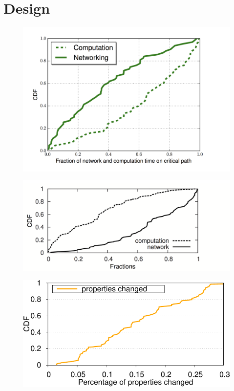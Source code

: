 \section{Design}
\label{sec:design}

\begin{figure}[t]
\centering
\includegraphics[width=0.9\columnwidth]{figs/comp_net.png}
\label{fig:mobile-runtime}
\end{figure}

\begin{figure}[t]
\centering
\includegraphics[width=0.9\columnwidth]{figs/comp_net_desk.png}
\label{fig:mobile-runtime}
\end{figure}

\begin{figure}[t]
\centering
\includegraphics[width=0.9\columnwidth]{figs/cdf_bigdata_sec_new.pdf}
\label{fig:properties-sec}
\end{figure}

